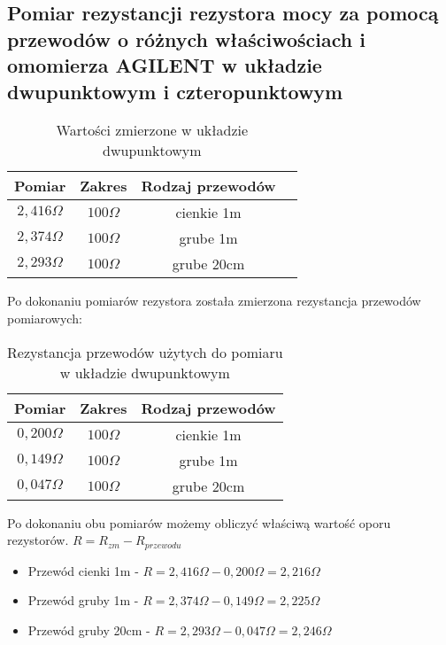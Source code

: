 \newpage
{\subsection{Pomiar rezystancji rezystora mocy za pomocą przewodów o różnych właściwościach i omomierza AGILENT w układzie dwupunktowym i czteropunktowym}} %

\begin{table}[!h]
    \centering
    \begin{tabular}{|c|c|c|c|}\hline
        Pomiar & Zakres & Rodzaj przewodów \\ \hline
        $2,416\Omega$ & $100\Omega$ & cienkie 1m \\ \hline
        $2,374\Omega$ & $100\Omega$ & grube 1m \\ \hline
        $2,293\Omega$ & $100\Omega$ & grube 20cm \\ \hline
    \end{tabular}
    \caption{Wartości zmierzone w układzie dwupunktowym}
    \label{tab:tabela-nr5}
\end{table}

\indent Po dokonaniu pomiarów rezystora została zmierzona rezystancja przewodów pomiarowych:

\begin{table}[!h]
    \centering
    \begin{tabular}{|c|c|c|} \hline
        Pomiar        & Zakres      & Rodzaj przewodów \\ \hline
        $0,200\Omega$ & $100\Omega$ & cienkie 1m \\ \hline
        $0,149\Omega$ & $100\Omega$ & grube 1m \\ \hline
        $0,047\Omega$ & $100\Omega$ & grube 20cm \\ \hline
    \end{tabular}
    \caption{Rezystancja przewodów użytych do pomiaru w układzie dwupunktowym}
    \label{tab:tabela-nr6}
\end{table}

Po dokonaniu obu pomiarów możemy obliczyć właściwą wartość oporu rezystorów. $ R = R_{zm}-R_{przewodu}$
\begin{itemize}
    \item Przewód cienki 1m - $R = 2,416\Omega - 0,200\Omega = 2,216\Omega$
    \item Przewód gruby 1m - $R = 2,374\Omega - 0,149\Omega = 2,225\Omega$
    \item Przewód gruby 20cm - $R = 2,293\Omega - 0,047\Omega = 2,246\Omega$
\end{itemize}

